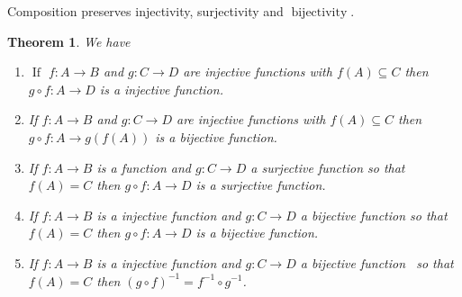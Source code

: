 \documentclass{book}
\newcommand{\tmop}[1]{\ensuremath{\operatorname{#1}}}
\newtheorem{theorem}{Theorem}
\begin{document}
Composition preserves injectivity, surjectivity and $\tmop{bijectivity}$.

\begin{theorem}
  \label{function composition injectivity, surjectivity and bijectivity}We
  have
  \begin{enumerate}
    \item $\tmop{If}$ $f : A \rightarrow B$ and $g : C \rightarrow D$ are
    injective functions with $f (A) \subseteq C$ then $g \circ f : A
    \rightarrow D$ is a injective function.
    
    \item If $f : A \rightarrow B$ and $g : C \rightarrow D$ are injective
    functions with $f (A) \subseteq C$ then $g \circ f : A \rightarrow g (f
    (A))$ is a bijective function.
    
    \item If $f : A \rightarrow B$ is a function and $g : C \rightarrow D$ a
    surjective function so that $f (A) = C$ then $g \circ f : A \rightarrow D$
    is a surjective function.
    
    \item If $f : A \rightarrow B$ is a injective function and $g : C
    \rightarrow D$ a bijective function so that $f (A) = C$ then $g \circ f :
    A \rightarrow D$ is a bijective function.
    
    \item If $f : A \rightarrow B$ is a injective function and $g : C
    \rightarrow D$ a bijective function \ so that $f (A) = C$ then $(g \circ
    f)^{- 1} = f^{- 1} \circ g^{- 1}$.
  \end{enumerate}
\end{theorem}
\end{document}
